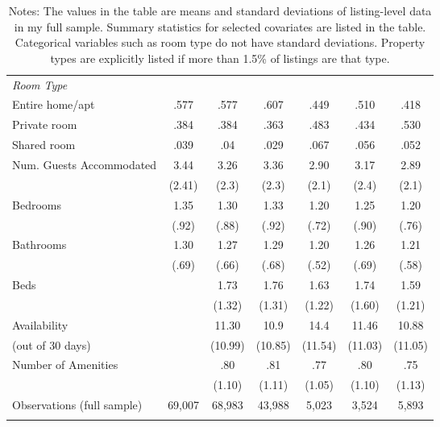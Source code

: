 {\begin{longtable}{l*{6}{c}}
\textit{Room Type} \\
Entire home/apt   &  .577 & .577   	&      .607	&      .449  &      .510		&    .418\\
Private room       & .384 & 	.384		&      .363	&      .483  &      .434		&    .530\\
Shared room      & .039 &	.04	 	&      .029	&      .067  &      .056		&    .052\\
[1em]
Num. Guests Accommodated    & 3.44   &      3.26	&      3.36  &      2.90		&    3.17 		&	 2.89\\
               & (2.41)    &     (2.3)         &     (2.3)         &     (2.1)         &     (2.4)         & (2.1)\\
[1em]
Bedrooms    &  1.35 &      1.30 &      1.33         &      1.20         &      1.25   & 1.20      \\
              &   (.92)   &     (.88)         &     (.92)         &     (.72)         &     (.90)       & (.76)  \\
[1em]
Bathrooms  & 1.30  &      1.27         &       1.29         &      1.20         &      1.26 & 1.21         \\
                &  (.69)  &     (.66)         &     (.68)         &     (.52)         &     (.69)         & (.58)\\
[1em]
Beds       &   &      1.73 &      1.76         &      1.63         &      1.74         & 1.59\\
               &     &     (1.32)         &     (1.31)         &     (1.22)         &     (1.60)   & (1.21)      \\
[1em]
Availability    &    &      11.30&      10.9&      14.4 &      11.46  	& 	10.88\\
(out of 30 days)         &      & (10.99)     &     (10.85)         &     (11.54)         &     (11.03)         &     (11.05)         \\
[1em]
Number of Amenities   &     &      .80		&      .81&      .77 &      .80  	& 	.75\\
           &    & (1.10)     &     (1.11)         &     (1.05)         &     (1.10)         &     (1.13)         \\


\hline
Observations (full sample)  & 69,007  & 68,983   &       43,988         &       5,023         &       3,524         &       5,893         \\
\hline\hline
\caption*{Notes: The values in the table are means and standard deviations of listing-level data in my full sample. Summary statistics for selected covariates are listed in the table. Categorical variables such as room type do not have standard deviations. Property types are explicitly listed if more than 1.5\% of listings are that type.}

\end{longtable}
}







